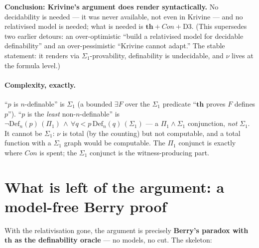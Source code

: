 \documentclass[11pt]{article}
\theoremstyle{plain}
\theoremstyle{definition}
\theoremstyle{remark}
\newcommand{\Con}{\mathit{Con}}
\newcommand{\thmT}{\mathbf{th}}
\begin{document}
\textbf{Conclusion: Krivine's argument does render syntactically.}  No
decidability is needed --- it was never available, not even in Krivine ---
and no relativised model is needed; what is needed is
$\thmT + \Con + {}$D3.  (This supersedes two earlier detours: an
over-optimistic ``build a relativised model for decidable definability''
and an over-pessimistic ``Krivine cannot adapt.''  The stable statement:
it renders via $\Sigma_1$-provability, definability is undecidable, and
$\nu$ lives at the formula level.)

\paragraph{Complexity, exactly.}  ``$p$ is $n$-definable'' is $\Sigma_1$
(a bounded $\exists F$ over the $\Sigma_1$ predicate ``$\thmT$ proves $F$
defines $p$'').  ``$p$ is the \emph{least} non-$n$-definable'' is
$\neg\mathrm{Def}_n(p)\,(\Pi_1)\,\wedge\,\forall q<p\,\mathrm{Def}_n(q)\,
(\Sigma_1)$ --- a $\Pi_1\wedge\Sigma_1$ conjunction, \emph{not} $\Sigma_1$.
It cannot be $\Sigma_1$: $\nu$ is total (by the counting) but not
computable, and a total function with a $\Sigma_1$ graph would be
computable.  The $\Pi_1$ conjunct is exactly where $\Con$ is spent; the
$\Sigma_1$ conjunct is the witness-producing part.

\section{What is left of the argument: a model-free Berry proof}
\label{sec:whatleft}

With the relativisation gone, the argument is precisely \textbf{Berry's
paradox with $\thmT$ as the definability oracle} --- no models, no cut.
The skeleton:
\end{document}
